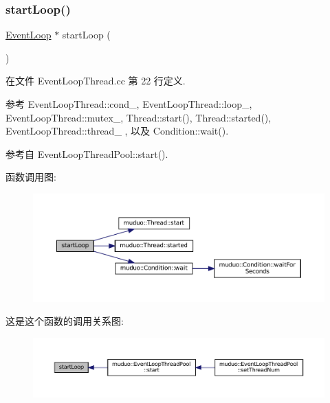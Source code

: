 \subsubsection{\texorpdfstring{start\+Loop()}{startLoop()}}
{\footnotesize\ttfamily \hyperlink{classmuduo_1_1EventLoop}{Event\+Loop} $\ast$ start\+Loop (\begin{DoxyParamCaption}{ }\end{DoxyParamCaption})}



在文件 Event\+Loop\+Thread.\+cc 第 22 行定义.



参考 Event\+Loop\+Thread\+::cond\+\_\+, Event\+Loop\+Thread\+::loop\+\_\+, Event\+Loop\+Thread\+::mutex\+\_\+, Thread\+::start(), Thread\+::started(), Event\+Loop\+Thread\+::thread\+\_\+ , 以及 Condition\+::wait().



参考自 Event\+Loop\+Thread\+Pool\+::start().

函数调用图\+:
\nopagebreak
\begin{figure}[H]
\begin{center}
\leavevmode
\includegraphics[width=350pt]{classmuduo_1_1EventLoopThread_a223c4c7a43f7d8c3e41071315efa78d1_cgraph}
\end{center}
\end{figure}
这是这个函数的调用关系图\+:
\nopagebreak
\begin{figure}[H]
\begin{center}
\leavevmode
\includegraphics[width=350pt]{classmuduo_1_1EventLoopThread_a223c4c7a43f7d8c3e41071315efa78d1_icgraph}
\end{center}
\end{figure}
\mbox{\label{classmuduo_1_1EventLoopThread_a539feb3c59a20db3b260b312fa7dea34}} 
